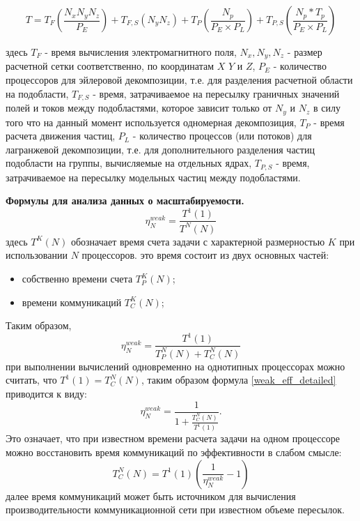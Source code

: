 \begin{equation}
\label{PIC-timestep}
T=T_{F} \left ( \frac{N_x N_y N_z }{P_E}\right )+ T_{F,S}\left (N_y N_z\right ) + T_P\left(\frac{N_p}{P_E\times P_L}\right) +T_{P,S}\left (\frac{N_p*T_p}{P_E\times P_L}\right)
\end{equation}

здесь $T_{F}$ - время вычисления электромагнитного поля, $N_x, N_y, N_z$ - размер расчетной сетки соответственно, по координатам $X$ $Y$ и $Z$, $P_E$ - количество процессоров для эйлеровой декомпозиции, т.е. для разделения расчетной области на подобласти, $T_{F,S}$ - время, затрачиваемое на пересылку граничных значений полей и токов между подобластями, которое зависит только от $N_y$ и $N_z$ в силу того что на данный момент используется одномерная декомпозиция,  $T_P$ - время расчета движения частиц, $P_L$ - количество процессов (или потоков) для лагранжевой декомпозиции, т.е. для дополнительного разделения частиц подобласти на группы, вычисляемые на отдельных ядрах, $T_{P,S}$ - время, затрачиваемое на пересылку модельных частиц между подобластями.

\textbf{Формулы для анализа данных о масштабируемости.}
\begin{equation}
\label{weak_eff}
\eta^{weak}_N = \frac{T^1(1)}{T^N(N)}
\end{equation}
здесь $T^K(N)$ обозначает время счета задачи с характерной размерностью $K$ при использовании $N$ процессоров.
это время состоит из двух основных частей:
\begin{itemize}
	\item собственно времени счета $T^K_{P}(N)$;
	\item времени коммуникаций $T^K_C(N)$;
\end{itemize}
Таким образом,
\begin{equation}
\label{weak_eff_detailed}
\eta^{weak}_N = \frac{T^1(1)}{T^N_{P}(N)+T^N_C(N)}
\end{equation}
при выполнении вычислений одновременно на однотипных процессорах
можно считать, что $T^1(1) = T^N_C(N)$, таким образом формула
\ref{weak_eff_detailed} приводится к виду:
\begin{equation}
\label{weak_eff_detailed-time}
\eta^{weak}_N = \frac{1}{1+ \frac{T^N_{C}(N)}{T^1(1)}}.
\end{equation}
Это означает, что при известном времени расчета задачи на одном процессоре можно восстановить время коммуникаций по эффективности в слабом смысле:
\begin{equation}
\label{comm_time_from_efficiency}
T^N_{C}(N) = T^1(1) \left(\frac{1}{\eta^{weak}_N} - 1\right)
\end{equation}
далее время коммуникаций может быть источником для вычисления производительности коммуникационной сети при известном объеме пересылок.

